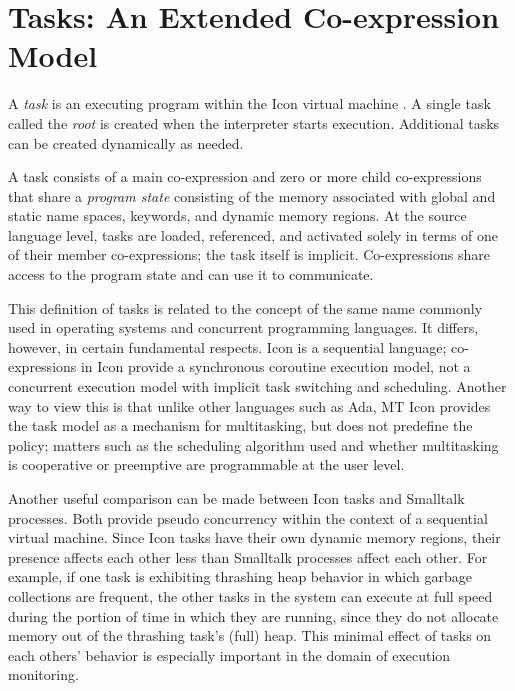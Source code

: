 \section{Tasks: An Extended Co-expression Model}

A {\em task\/} is an executing program within the Icon virtual machine
\cite{Griswold86}.  A single task called the {\em root\/} is created
when the interpreter starts execution. Additional tasks can be created
dynamically as needed.

A task consists of a main co-expression and zero or more child
co-expressions that share a {\em program state\/} consisting of
 the memory associated with global and static name
spaces, keywords, and dynamic memory regions.  At the source language level,
tasks are loaded, referenced, and activated solely in terms of one of their
member co-expressions; the task itself is implicit.
Co-expressions share access to the
program state and can use it to communicate.

This definition of tasks is related to the concept of the same name
commonly used in operating systems and concurrent programming
languages.  It differs, however, in certain fundamental respects.
Icon is a sequential language; co-expressions in Icon provide a
synchronous coroutine execution model, not a concurrent execution
model with implicit task switching and scheduling.  Another way to
view this is that unlike other languages such as Ada, MT Icon provides
the task model as a mechanism for multitasking, but does not
predefine the policy; matters such as the scheduling algorithm used
and whether multitasking is cooperative or preemptive are
programmable at the user level.

Another useful comparison can be made between Icon tasks and Smalltalk
processes.  Both provide pseudo concurrency within the context of a
sequential virtual machine.  Since Icon tasks have their own dynamic
memory regions, their presence affects each other less than
Smalltalk processes affect each other.  For example, if one task is
exhibiting thrashing heap behavior in which garbage collections are
frequent, the other tasks in the system can execute at full speed
during the portion of time in which they are running, since they
do not allocate memory out of the thrashing task's (full) heap.
This minimal effect of tasks on each others' behavior is especially
important in the domain of execution monitoring.


